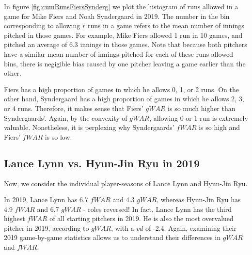 \documentclass[12pt]{article}
\begin{document}
In figure \ref{fig:cumRunsFiersSynderg} we plot the histogram of runs allowed in a game for Mike Fiers and Noah Syndergaard in 2019. The number in the bin corresponding to allowing $r$ runs in a game refers to the mean number of innings pitched in those games. For example, Mike Fiers allowed 1 run in 10 games, and pitched an average of 6.3 innings in those games. Note that because both pitchers have a similar mean number of innings pitched for each of these runs-allowed bins, there is negigible bias caused by one pitcher leaving a game earlier than the other. 

Fiers has a high proportion of games in which he allows 0, 1, or 2 runs. On the other hand, Syndergaard has a high proportion of games in which he allows 2, 3, or 4 runs. Therefore, it makes sense that Fiers' $gWAR$ is so much higher than Syndergaards'. Again, by the convexity of $gWAR$, allowing 0 or 1 run is extremely valuable. Nonetheless, it is perplexing why Syndergaards' $fWAR$ is so high and Fiers' $fWAR$ is so low. 



\subsection{Lance Lynn vs. Hyun-Jin Ryu in 2019}

Now, we consider the individual player-seasons of Lance Lynn and Hyun-Jin Ryu.

In 2019, Lance Lynn has 6.7 $fWAR$ and 4.3 $gWAR$, whereas Hyun-Jin Ryu has 4.9 $fWAR$ and 6.7 $gWAR$ - roles reversed! In fact, Lance Lynn has the third highest $fWAR$ of all starting pitchers in 2019. He is also the most overvalued pitcher in 2019, according to $gWAR$, with a $vd$ of -2.4. Again, examining their 2019 game-by-game statistics allows us to understand their differences in $gWAR$ and $fWAR$.
\end{document}
